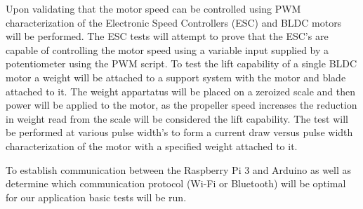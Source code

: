 Upon validating that the motor speed can be controlled using PWM characterization of the Electronic Speed Controllers (ESC) and BLDC motors will be performed. The ESC tests will attempt to prove that the ESC's are capable of controlling the motor speed using a variable input supplied by a potentiometer using the PWM script. To test the lift capability of a single BLDC motor a weight will be attached to a support system with the motor and blade attached to it. The weight appartatus will be placed on a zeroized scale and then power will be applied to the motor, as the propeller speed increases the reduction in weight read from the scale will be considered the lift capability. The test will be performed at various pulse width's to form a current draw versus pulse width characterization of the motor with a specified weight attached to it. 

To establish communication between the Raspberry Pi 3 and Arduino as well as determine which communication protocol (Wi-Fi or Bluetooth) will be optimal for our application basic tests will be run. 


 

